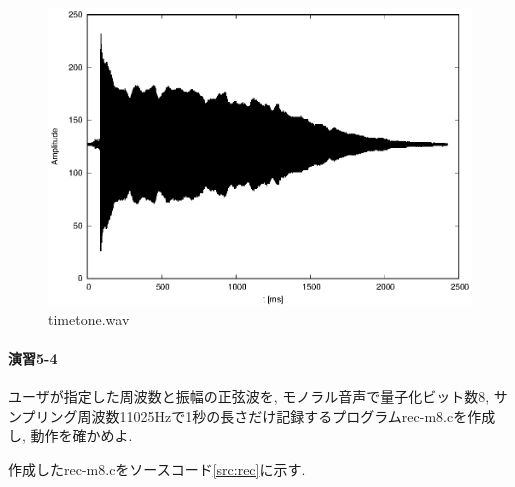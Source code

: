 \documentclass[titlepage]{jsarticle}
\begin{document}
        \begin{figure}[ht]
            \centering
            \includegraphics[width=12cm]{images/timetone.eps}
            \caption{timetone.wav}
            \label{fig:timetone}
        \end{figure}

    \paragraph{演習5-4} ユーザが指定した周波数と振幅の正弦波を, モノラル音声で量子化ビット数8,
    サンプリング周波数11025Hzで1秒の長さだけ記録するプログラムrec-m8.cを作成し, 動作を確かめよ.

        作成したrec-m8.cをソースコード\ref{src:rec}に示す.

        \clearpage
\end{document}
